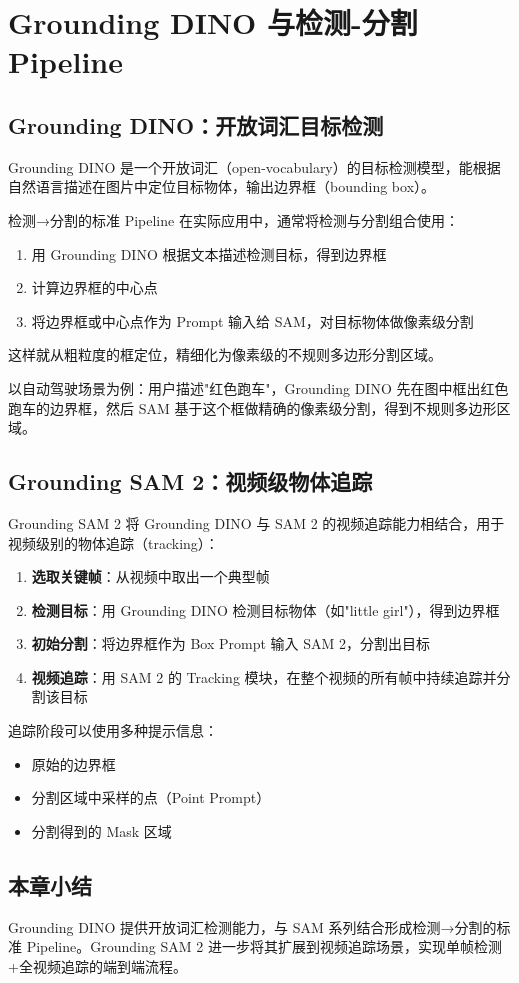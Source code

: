 \section{Grounding DINO 与检测-分割 Pipeline}

\subsection{Grounding DINO：开放词汇目标检测}

Grounding DINO 是一个开放词汇（open-vocabulary）的目标检测模型，能根据自然语言描述在图片中定位目标物体，输出边界框（bounding box）。

\begin{importantbox}{检测→分割的标准 Pipeline}
在实际应用中，通常将检测与分割组合使用：
\begin{enumerate}
    \item 用 Grounding DINO 根据文本描述检测目标，得到边界框
    \item 计算边界框的中心点
    \item 将边界框或中心点作为 Prompt 输入给 SAM，对目标物体做像素级分割
\end{enumerate}
这样就从粗粒度的框定位，精细化为像素级的不规则多边形分割区域。
\end{importantbox}

以自动驾驶场景为例：用户描述"红色跑车"，Grounding DINO 先在图中框出红色跑车的边界框，然后 SAM 基于这个框做精确的像素级分割，得到不规则多边形区域。

\subsection{Grounding SAM 2：视频级物体追踪}

Grounding SAM 2 将 Grounding DINO 与 SAM 2 的视频追踪能力相结合，用于视频级别的物体追踪（tracking）：

\begin{enumerate}
    \item \textbf{选取关键帧}：从视频中取出一个典型帧
    \item \textbf{检测目标}：用 Grounding DINO 检测目标物体（如"little girl"），得到边界框
    \item \textbf{初始分割}：将边界框作为 Box Prompt 输入 SAM 2，分割出目标
    \item \textbf{视频追踪}：用 SAM 2 的 Tracking 模块，在整个视频的所有帧中持续追踪并分割该目标
\end{enumerate}

追踪阶段可以使用多种提示信息：
\begin{itemize}
    \item 原始的边界框
    \item 分割区域中采样的点（Point Prompt）
    \item 分割得到的 Mask 区域
\end{itemize}

\subsection{本章小结}

Grounding DINO 提供开放词汇检测能力，与 SAM 系列结合形成检测→分割的标准 Pipeline。Grounding SAM 2 进一步将其扩展到视频追踪场景，实现单帧检测+全视频追踪的端到端流程。


